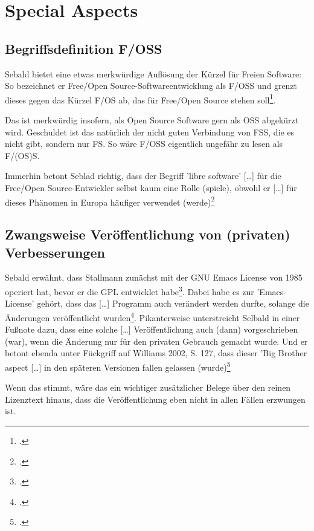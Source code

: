\documentclass[DIV=calc,BCOR=5mm,11pt,headings=small,oneside,abstract=true, toc=bib]{scrartcl}
\begin{document}
\section{Special Aspects}

\subsection{Begriffsdefinition F/OSS}

Sebald bietet eine etwas merkwürdige Auflösung der Kürzel für Freien Software:
So bezeichnet er \glqq{}Free/Open Source-Softwareentwicklung\grqq{} als
\glqq{}F/OSS\grqq{} und grenzt dieses gegen das Kürzel \glqq{}F/OS\grqq{} ab,
das für \glqq{}Free/Open Source\grqq{} stehen
soll\footcite[vgl.][15]{Sebald2008a}. 

Das ist merkwürdig insofern, als Open Source Software gern als OSS abgekürzt
wird. Geschuldet ist das natürlich der nicht guten Verbindung von FSS, die es
nicht gibt, sondern nur FS. So wäre F/OSS eigentlich ungefähr zu lesen als
F/(OS)S.

Immerhin betont Seblad richtig, dass \glqq{}der Begriff 'libre software'
[\ldots]  für die Free/Open Source-Entwickler selbst kaum eine Rolle
(spiele)\grqq{}, obwohl er \glqq{}[\ldots] für dieses Phänomen in Europa
häufiger verwendet (werde)\grqq{}\footcite[vgl.][15, Anm.7]{Sebald2008a}

\subsection{Zwangsweise Veröffentlichung von (privaten) Verbesserungen}

Sebald erwähnt, dass Stallmann zunächst mit der \glqq{}GNU Emacs License
von 1985\grqq{} operiert hat, bevor er die GPL entwicklet
habe\footcite[vgl.][76]{Sebald2008a}. Dabei habe es zur 'Emacs-License' gehört,
dass das \glqq{}[\ldots] Programm auch verändert werden durfte, solange
die Änderungen veröffentlicht wurden\grqq{}\footcite[vgl.][76]{Sebald2008a}.
Pikanterweise unterstreicht Selbald in einer Fußnote dazu, dass
eine solche \glqq{}[\ldots] Veröffentlichung auch (dann) vorgeschrieben (war),
wenn die Änderung nur für den privaten Gebrauch gemacht wurde\grqq{}. Und er
betont ebenda unter Fückgriff auf Williams 2002, S. 127, dass
\glqq{}dieser 'Big Brother aspect [\ldots] in den späteren Versionen
fallen gelassen (wurde)\grqq{}\footcite[vgl.][76 Anm. 85]{Sebald2008a}

Wenn das stimmt, wäre das ein wichtiger zusätzlicher Belege über den reinen
Lizenztext hinaus, dass die Veröffentlichung eben nicht in allen Fällen
erzwungen ist.

\small

\end{document}
